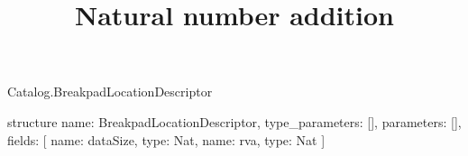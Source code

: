 \begin{lexlean}{Catalog.BreakpadLocationDescriptor}
\title{Natural number addition}
\begin{semanticmodule}
structure{
  name: BreakpadLocationDescriptor,
  type_parameters: [],
  parameters: [],
  fields: [
    {name: dataSize, type: Nat},
    {name: rva, type: Nat}
  ]
}
\end{semanticmodule}
\end{lexlean}
